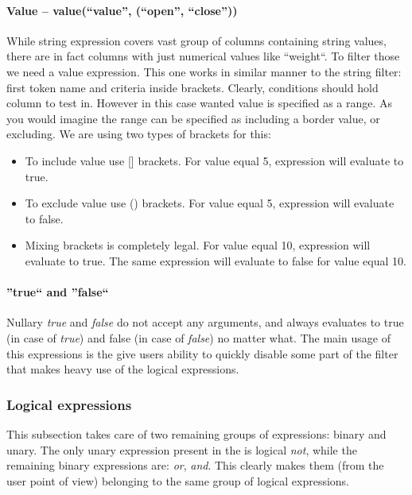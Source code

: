 \paragraph{Value -- value(``value'', (``open'', ``close''))}
While string expression covers vast group of columns containing string values, there are in fact columns with just numerical values like
``weight``. To filter those we need a value expression. This one works in similar manner to the string filter: first token name and criteria
inside brackets. Clearly, conditions should hold column to test in. However in this case wanted value is specified as a range.
As you would imagine the range can be specified as including a border value, or excluding. We are using two types of brackets for this:
\begin{itemize}
 \item To include value use [] brackets. For value equal 5, expression  will evaluate to true.
 \item To exclude value use () brackets. For value equal 5, expression  will evaluate to false.
 \item Mixing brackets is completely legal. For value equal 10, expression \mono{value(something, [5, 10)} will evaluate to true.
 The same expression will evaluate to false for value equal 10.
\end{itemize}

\paragraph{''true`` and ''false``}
Nullary \textit{true} and \textit{false} do not accept any arguments, and always evaluates to true (in case of \textit{true})
and false (in case of \textit{false})  no matter what. The main usage of this expressions is the give users ability to quickly
disable some part of the filter that makes heavy use of the logical expressions. 

\subsubsection{Logical expressions}
This subsection takes care of two remaining groups of expressions: binary and unary. The only unary expression present in the \OCS{} is logical
\textit{not}, while the remaining binary expressions are: \textit{or}, \textit{and}. This clearly makes them (from the user point of view)
belonging to the same group of logical expressions.

